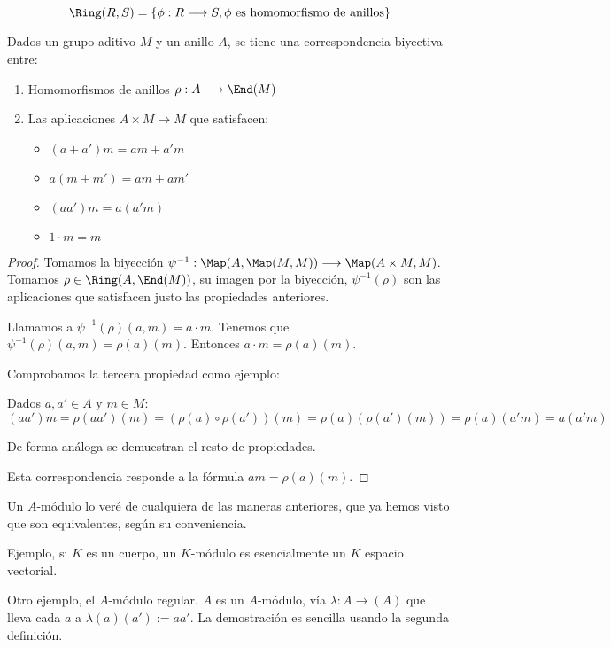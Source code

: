 \begin{df}
  \[
    \Ring(R,S)=\{\phi:R\longrightarrow S, \phi \textrm{ es homomorfismo
    de anillos}\}
  \]
\end{df}


\begin{prop}
  Dados un grupo aditivo \(M\) y un anillo \(A\), se tiene una
  correspondencia biyectiva entre:
  \begin{enumerate}
    \item Homomorfismos de anillos \(\rho:A\longrightarrow\End(M)\)
    \item Las aplicaciones \(A\times M\longrightarrow M\)
      que satisfacen:
      \begin{itemize}
        \item \((a+a')m=am+a'm\)
        \item \(a(m+m')=am+am'\)
        \item \((aa')m=a(a'm)\)
        \item \(1\cdot m=m\)
      \end{itemize}
  \end{enumerate}
\end{prop}

\begin{proof}
  Tomamos la biyección \(\psi^{-1}:\Map(A,\Map(M,M))\longrightarrow
  \Map(A\times M,M)\).
  Tomamos \(\rho\in\Ring(A,\End(M))\), su imagen por la biyección,
  \(\psi^{-1}(\rho)\)
  son las aplicaciones que satisfacen justo las propiedades
  anteriores.

  Llamamos a \(\psi^{-1}(\rho)(a,m)=a\cdot m\). Tenemos que
  \(\psi^{-1}(\rho)(a,m)=\rho(a)(m)\). Entonces
  \(a\cdot m=\rho(a)(m)\).

  Comprobamos la tercera propiedad como ejemplo:

  Dados \(a, a'\in A\) y \(m\in M\):
  \[
    (aa')m=\rho(aa')(m)=(\rho(a)\circ\rho(a'))(m)
    =\rho(a)(\rho(a')(m))=\rho(a)(a'm)=a(a'm)
  \]

  De forma análoga se demuestran el resto de propiedades.

  Esta correspondencia responde a la fórmula \(am=\rho(a)(m)\).
\end{proof}

Un \(A\)-módulo lo veré de cualquiera de las maneras anteriores, que
ya hemos visto que son equivalentes, según su conveniencia.

Ejemplo, si \(K\) es un cuerpo, un \(K\)-módulo es esencialmente
un \(K\) espacio vectorial.

Otro ejemplo, el \(A\)-módulo regular. \(A\) es un \(A\)-módulo, vía
\(\lambda:A\longrightarrow(A)\) que lleva cada
\(a\) a \(\lambda(a)(a'):=aa'\). La demostración es sencilla
usando la segunda definición.

